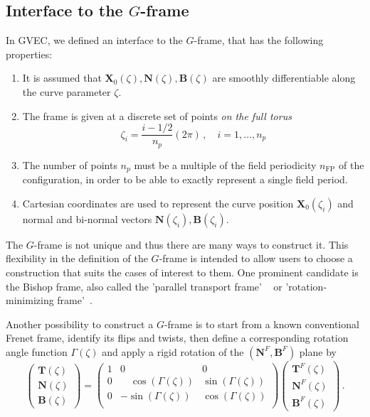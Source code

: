\documentclass[12pt]{iopart}
\newcommand\hlchangedrev[1]{#1} %
\newcommand\X{{\bm{X}}_0}
\newcommand\Tfrenet{{\bm T}^F}
\newcommand\Nfrenet{{\bm N}^F}
\newcommand\Bfrenet{{\bm B}^F}
\newcommand\Nnew{{\bm N}}
\newcommand\Bnew{{\bm B}}
\newcommand\GFF{$G$-frame}
\newcommand\nfp{n_\textrm{FP}}
\newcommand\binormal[1]{bi-normal{#1}}
\begin{document}
\subsection{Interface to the \GFF{} \label{sec:gff_interface}}
In GVEC, we defined an interface to the \GFF{}, that has the following properties:
\begin{enumerate}
    \item It is assumed that $\X(\zeta),\Nnew(\zeta),\Bnew(\zeta)$ are smoothly differentiable along the curve parameter $\zeta$.
    \item The frame is given at a discrete set of points \emph{on the full torus} 
    \begin{equation}
        \zeta_i=\frac{i-1/2}{n_p}(2\pi)\,,\quad i=1,\dots,n_p \label{eq:zeta_i}
    \end{equation}
    \item The number of points $n_p$ must be a multiple of the field periodicity $\nfp$ of the configuration, in order to be able to exactly represent a single field period.
    \item Cartesian coordinates are used to represent the curve position $\X(\zeta_i)$ and normal and \binormal{ } vectors $\Nnew(\zeta_i),\Bnew(\zeta_i)$.
\end{enumerate}

The \GFF{} is not unique and thus there are many ways to construct it. This flexibility in the definition of the \GFF{} is intended to allow users to choose a construction that suits the cases of interest to them. One prominent candidate is the Bishop frame, also called the 'parallel transport frame' ~\cite{bishop_frame,yilmaz_new_bishop} or 'rotation-minimizing frame'~\cite{rotation_minimizing_frame}. 

Another possibility to construct a \GFF{} is to start from a known conventional Frenet frame, identify \hlchangedrev{its flips} and twists, then define a corresponding rotation angle function $\Gamma(\zeta)$ and apply a rigid rotation of the $(\Nfrenet,\Bfrenet)$ plane by
\begin{equation}
    \begin{pmatrix}
       {\bm T}(\zeta)\\\Nnew(\zeta)\\\Bnew(\zeta)
    \end{pmatrix} = \begin{pmatrix}
       1 & 0 & 0\\ 0 &\quad\cos(\Gamma(\zeta)) & \sin(\Gamma(\zeta))\\ 0 & -\sin(\Gamma(\zeta)) & \cos(\Gamma(\zeta))\\
    \end{pmatrix} \begin{pmatrix}
        \Tfrenet(\zeta)\\\Nfrenet(\zeta)\\\Bfrenet(\zeta)
     \end{pmatrix}\,. \label{eq:untwist}
\end{equation}
\end{document}
